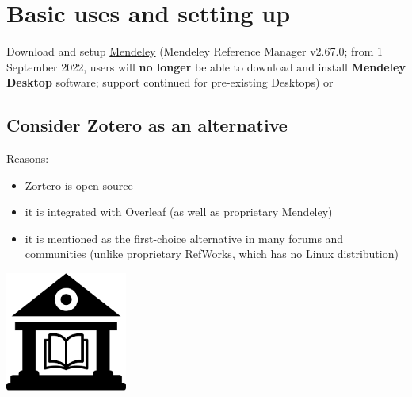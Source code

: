 \documentclass[a4paper,11pt]{article}
\begin{document}
\section{Basic uses and setting up}

Download and setup \href{https://www.mendeley.com/release-notes-reference-manager/}{Mendeley} (Mendeley Reference Manager v2.67.0; from 1 September 2022, users will \textbf{no longer} be able to download and install \textbf{Mendeley Desktop} software; support continued for pre-existing Desktops) or

\subsection{Consider Zotero as an alternative}

\begin{minipage}[c]{0.7\linewidth}
	Reasons:
	\begin{itemize}
		\item Zortero is open source 
		\item it is integrated with Overleaf (as well as proprietary Mendeley)
		\item it is mentioned as the first-choice alternative in many forums and communities (unlike proprietary RefWorks, which has no Linux distribution)
	\end{itemize}
\end{minipage}	
\begin{minipage}[c]{0.3\linewidth}
	\centering
	\includegraphics[width=40mm]{pics/library_icon.png} 
	
\end{minipage}
\end{document}
